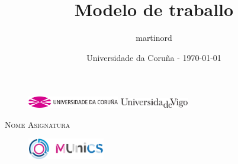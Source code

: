 \documentclass[11pt]{article}
\begin{document}
\makeatletter	%


\title{Modelo de traballo}

\def \subtitle {Subtítulo}

\def \modulename {Nome Asignatura}

\author{martinord}

\date{Universidade da Coruña - \today}


\begin{titlepage}

\begin{figure}[ht]
        \centering
        \begin{minipage}[t]{.45\linewidth}
       		\centering
            \includegraphics[width=4cm]{udclogo.pdf}
        \end{minipage}
        \hspace{\fill}
        \begin{minipage}[t]{.45\linewidth}
        	\centering
            \includegraphics[width=3cm]{uvigologo.pdf}
        \end{minipage}
\end{figure}

\vfill

\newcommand{\HRule}{\rule{\linewidth}{0.5mm}} %

\center %
 
 
\textsc{\Large \modulename}\\[1cm]

\begin{figure}[!h]
	\centering
	\includegraphics[width=0.3\textwidth]{logo.png}
\end{figure}

\vfill


\end{titlepage}
\end{document}
